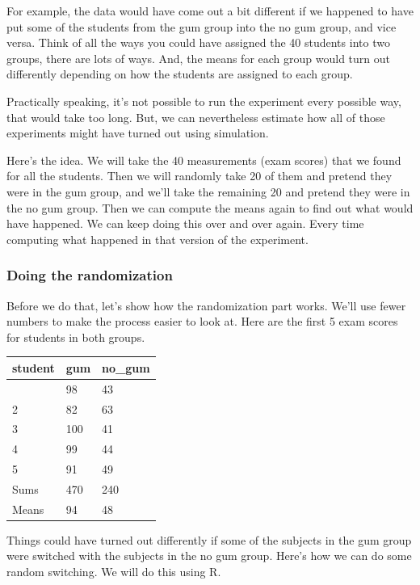 \documentclass[
  letterpaper,
  DIV=11,
  numbers=noendperiod]{scrreprt}
\begin{document}
For example, the data would have come out a bit different if we happened
to have put some of the students from the gum group into the no gum
group, and vice versa. Think of all the ways you could have assigned the
40 students into two groups, there are lots of ways. And, the means for
each group would turn out differently depending on how the students are
assigned to each group.

Practically speaking, it's not possible to run the experiment every
possible way, that would take too long. But, we can nevertheless
estimate how all of those experiments might have turned out using
simulation.

Here's the idea. We will take the 40 measurements (exam scores) that we
found for all the students. Then we will randomly take 20 of them and
pretend they were in the gum group, and we'll take the remaining 20 and
pretend they were in the no gum group. Then we can compute the means
again to find out what would have happened. We can keep doing this over
and over again. Every time computing what happened in that version of
the experiment.

\subsubsection{Doing the randomization}\label{doing-the-randomization}

Before we do that, let's show how the randomization part works. We'll
use fewer numbers to make the process easier to look at. Here are the
first 5 exam scores for students in both groups.

\begin{longtable}[]{@{}lll@{}}
\toprule\noalign{}
student & gum & no\_gum \\
\midrule\noalign{}
\endhead
\bottomrule\noalign{}
\endlastfoot
1 & 98 & 43 \\
2 & 82 & 63 \\
3 & 100 & 41 \\
4 & 99 & 44 \\
5 & 91 & 49 \\
Sums & 470 & 240 \\
Means & 94 & 48 \\
\end{longtable}

Things could have turned out differently if some of the subjects in the
gum group were switched with the subjects in the no gum group. Here's
how we can do some random switching. We will do this using R.
\end{document}
